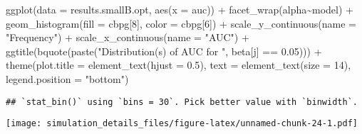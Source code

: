 \documentclass[
]{article}
\newenvironment{Shaded}{\begin{snugshade}}{\end{snugshade}}
\newcommand{\AttributeTok}[1]{\textcolor[rgb]{0.77,0.63,0.00}{#1}}
\newcommand{\DecValTok}[1]{\textcolor[rgb]{0.00,0.00,0.81}{#1}}
\newcommand{\FloatTok}[1]{\textcolor[rgb]{0.00,0.00,0.81}{#1}}
\newcommand{\FunctionTok}[1]{\textcolor[rgb]{0.00,0.00,0.00}{#1}}
\newcommand{\NormalTok}[1]{#1}
\newcommand{\SpecialCharTok}[1]{\textcolor[rgb]{0.00,0.00,0.00}{#1}}
\newcommand{\StringTok}[1]{\textcolor[rgb]{0.31,0.60,0.02}{#1}}
\begin{document}
\begin{Shaded}
\begin{Highlighting}[]
\FunctionTok{ggplot}\NormalTok{(}\AttributeTok{data =}\NormalTok{ results.smallB.opt,}
       \FunctionTok{aes}\NormalTok{(}\AttributeTok{x =}\NormalTok{ auc)) }\SpecialCharTok{+}
  \FunctionTok{facet\_wrap}\NormalTok{(alpha}\SpecialCharTok{\textasciitilde{}}\NormalTok{model) }\SpecialCharTok{+}
  \FunctionTok{geom\_histogram}\NormalTok{(}\AttributeTok{fill =}\NormalTok{ cbpg[}\DecValTok{8}\NormalTok{], }\AttributeTok{color =}\NormalTok{ cbpg[}\DecValTok{6}\NormalTok{]) }\SpecialCharTok{+}
  \FunctionTok{scale\_y\_continuous}\NormalTok{(}\AttributeTok{name =} \StringTok{"Frequency"}\NormalTok{) }\SpecialCharTok{+}
  \FunctionTok{scale\_x\_continuous}\NormalTok{(}\AttributeTok{name =} \StringTok{"AUC"}\NormalTok{) }\SpecialCharTok{+}
  \FunctionTok{ggtitle}\NormalTok{(}\FunctionTok{bquote}\NormalTok{(}\FunctionTok{paste}\NormalTok{(}\StringTok{"Distribution(s) of AUC for "}\NormalTok{, beta[j] }\SpecialCharTok{==} \FloatTok{0.05}\NormalTok{))) }\SpecialCharTok{+}
  \FunctionTok{theme}\NormalTok{(}\AttributeTok{plot.title =} \FunctionTok{element\_text}\NormalTok{(}\AttributeTok{hjust =} \FloatTok{0.5}\NormalTok{), }
        \AttributeTok{text =} \FunctionTok{element\_text}\NormalTok{(}\AttributeTok{size =} \DecValTok{14}\NormalTok{),}
        \AttributeTok{legend.position =} \StringTok{"bottom"}\NormalTok{)}
\end{Highlighting}
\end{Shaded}

\begin{verbatim}
## `stat_bin()` using `bins = 30`. Pick better value with `binwidth`.
\end{verbatim}

\texttt{[image: simulation\_details\_files/figure-latex/unnamed-chunk-24-1.pdf]}
\end{document}
